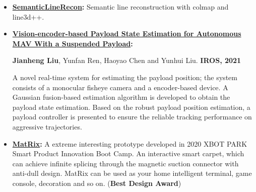 \documentclass[11pt,a4paper,sans]{moderncv}        %
\begin{document}
\begin{itemize}

\item \textbf{\href{https://github.com/jianhengLiu/SV-SLAM}{SemanticLineRecon}:} Semantic line reconstruction with colmap and line3d++.


\item \textbf{\href{https://github.com/jianhengLiu/Vision-encoder-based-Payload-State-Estimator}{Vision-encoder-based Payload State Estimation for Autonomous MAV With a Suspended Payload}:} 

\textbf{Jianheng Liu}, Yunfan Ren, Haoyao Chen and Yunhui Liu. \textbf{IROS, 2021}

A novel real-time system for estimating the payload position; the system consists of a monocular fisheye camera and a encoder-based device. A Gaussian fusion-based estimation algorithm is developed to obtain the payload state estimation. Based on the robust payload position estimation, a payload controller is presented to ensure the reliable tracking performance on aggressive trajectories.


\item \textbf{\href{https://www.bilibili.com/video/BV1gb4y127by?share_source=copy_web}{MatRix}:} A extreme interesting prototype developed in 2020 XBOT PARK Smart Product Innovation Boot Camp. An interactive smart carpet, which can achieve infinite splicing through the magnetic suction connector with anti-dull design. MatRix can be used as your home intelligent terminal, game console, decoration and so on. (\textbf{Best Design Award})


\end{itemize}
\end{document}
